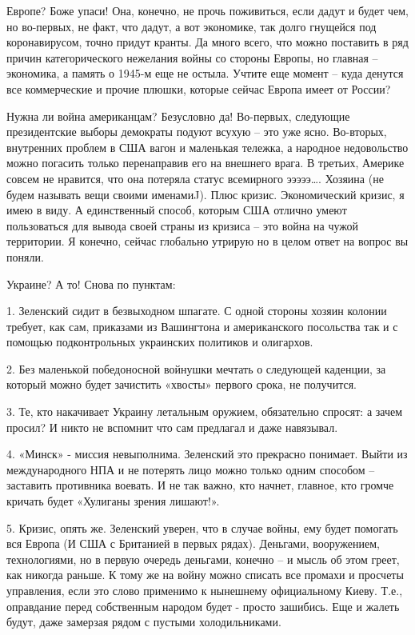 Европе? Боже упаси! Она, конечно, не прочь поживиться, если дадут и будет чем,
но во-первых, не факт, что дадут, а вот экономике, так долго гнущейся под
коронавирусом, точно придут кранты. Да много всего, что можно поставить в ряд
причин категорического нежелания войны со стороны Европы, но главная –
экономика, а память о 1945-м еще не остыла. Учтите еще момент – куда денутся
все коммерческие и прочие плюшки, которые сейчас Европа имеет от России?

Нужна ли война американцам? Безусловно да! Во-первых, следующие президентские
выборы демократы подуют всухую – это уже ясно. Во-вторых, внутренних проблем в
США вагон и маленькая тележка, а народное недовольство можно погасить только
перенаправив его на внешнего врага. В третьих, Америке совсем не нравится, что
она потеряла статус всемирного эээээ…. Хозяина (не будем называть вещи своими
именамиJ). Плюс кризис. Экономический кризис, я имею в виду. А единственный
способ, которым США отлично умеют пользоваться для вывода своей страны из
кризиса – это война на чужой территории. Я конечно, сейчас глобально утрирую но
в целом ответ на вопрос вы поняли.

Украине? А то! Снова по пунктам:

1. Зеленский сидит в безвыходном шпагате. С одной стороны хозяин колонии
требует, как сам, приказами из Вашингтона и американского посольства так и с
помощью подконтрольных украинских политиков и олигархов.

2. Без маленькой победоносной войнушки мечтать о следующей каденции, за который
можно будет зачистить «хвосты» первого срока, не получится.

3. Те, кто накачивает Украину летальным оружием, обязательно спросят: а зачем
просил? И никто не вспомнит что сам предлагал и даже навязывал.

4. «Минск» - миссия невыполнима. Зеленский это прекрасно понимает. Выйти из
международного НПА и не потерять лицо можно только одним способом – заставить
противника воевать. И не так важно, кто начнет, главное, кто громче кричать
будет «Хулиганы зрения лишают!».

5. Кризис, опять же. Зеленский уверен, что в случае войны, ему будет помогать
вся Европа (И США с Британией в первых рядах). Деньгами, вооружением,
технологиями, но в первую очередь деньгами, конечно – и мысль об этом греет,
как никогда раньше. К тому же на войну можно списать все промахи и просчеты
управления, если это слово применимо к нынешнему официальному Киеву. Т.е.,
оправдание перед собственным народом будет - просто зашибись. Еще и жалеть
будут, даже замерзая рядом с пустыми холодильниками.

